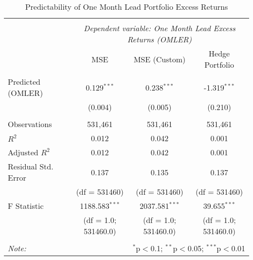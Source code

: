\begin{table}[H] \centering
\begin{tabular}{@{\extracolsep{5pt}}lccc}
\\[-1.8ex]\hline
\hline \\[-1.8ex]
& \multicolumn{3}{c}{\textit{Dependent variable: One Month Lead Excess Returns (OMLER)}} \
\cr \cline{2-4}
\\[-1.8ex] &  MSE & MSE (Custom) & Hedge Portfolio \\
\hline \\[-1.8ex]
 Predicted (OMLER)  & 0.129$^{***}$ & 0.238$^{***}$ & -1.319$^{***}$ \\
  & (0.004) & (0.005) & (0.210) \\
\hline \\[-1.8ex]
 Observations & 531,461 & 531,461 & 531,461 \\
 $R^2$ & 0.012 & 0.042 & 0.001 \\
 Adjusted $R^2$ & 0.012 & 0.042 & 0.001 \\
 Residual Std. Error & 0.137 & 0.135 & 0.137 \\
 &(df = 531460)&(df = 531460)&(df = 531460)\\
 F Statistic & 1188.583$^{***}$ & 2037.581$^{***}$ & 39.655$^{***}$ \\
 &(df = 1.0; 531460.0)&(df = 1.0; 531460.0)&(df = 1.0; 531460.0)\\ 
\hline
\hline \\[-1.8ex]
\textit{Note:} & \multicolumn{3}{r}{$^{*}$p$<$0.1; $^{**}$p$<$0.05; $^{***}$p$<$0.01} \\
\end{tabular}
\caption{Predictability of One Month Lead Portfolio Excess Returns}
\end{table}
